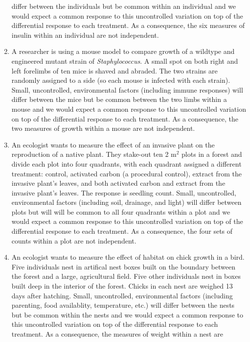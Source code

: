\documentclass[]{book}
\begin{document}
\begin{enumerate}
  differ between the individuals but be common within an individual and
  we would expect a common response to this uncontrolled variation on
  top of the differential response to each treatment. As a consequence,
  the six measures of insulin within an individual are not independent.
\item
  A researcher is using a mouse model to compare growth of a wildtype
  and engineered mutant strain of \emph{Staphylococcus}. A small spot on
  both right and left forelimbs of ten mice is shaved and abraded. The
  two strains are randomly assigned to a side (so each mouse is infected
  with each strain). Small, uncontrolled, environmental factors
  (including immune responses) will differ between the mice but be
  common between the two limbs within a mouse and we would expect a
  common response to this uncontrolled variation on top of the
  differential response to each treatment. As a consequence, the two
  measures of growth within a mouse are not independent.
\item
  An ecologist wants to measure the effect of an invasive plant on the
  reproduction of a native plant. They stake-out ten 2 m\(^2\) plots in
  a forest and divide each plot into four quadrants, with each quadrant
  assigned a different treatment: control, activated carbon (a
  procedural control), extract from the invasive plant's leaves, and
  both activated carbon and extract from the invasive plant's leaves.
  The response is seedling count. Small, uncontrolled, environmental
  factors (including soil, drainage, and light) will differ between
  plots but will will be common to all four quadrants within a plot and
  we would expect a common response to this uncontrolled variation on
  top of the differential response to each treatment. As a consequence,
  the four sets of counts within a plot are not independent.
\item
  An ecologist wants to measure the effect of habitat on chick growth in
  a bird. Five individuals nest in artifical nest boxes built on the
  boundary between the forest and a large, agricultural field. Five
  other individuals nest in boxes built deep in the interior of the
  forest. Chicks in each nest are weighed 13 days after hatching. Small,
  uncontrolled, environmental factors (including parenting, food
  availablity, temperature, etc.) will differ between the nests but be
  common within the nests and we would expect a common response to this
  uncontrolled variation on top of the differential response to each
  treatment. As a consequence, the measures of weight within a nest are

\end{enumerate}
\end{document}
